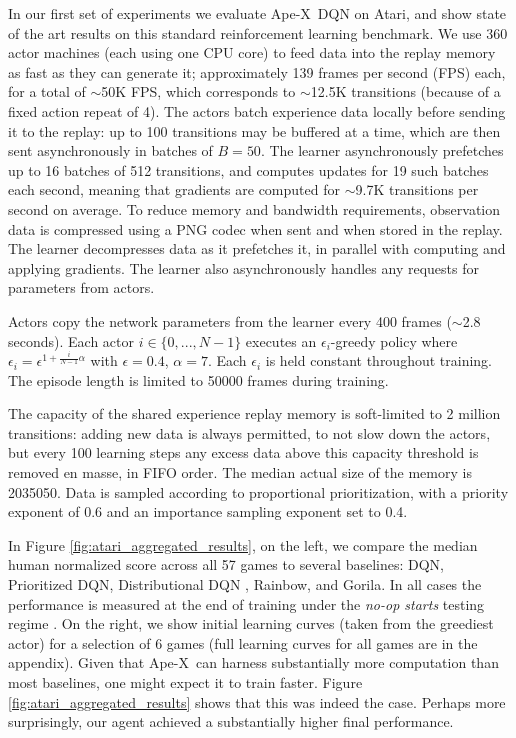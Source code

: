\documentclass{article} \PassOptionsToPackage{usenames,dvipsnames}{xcolor}
\def\apex{Ape-X}
\begin{document}
\setlength\dashlinedash{1pt}
\setlength\dashlinegap{1.5pt}
\setlength\arrayrulewidth{0.3pt}

In our first set of experiments we evaluate \apex\ DQN on Atari, and show state of the art results on this standard reinforcement learning benchmark. We use 360 actor machines (each using one CPU core) to feed data into the replay memory as fast as they can generate it; approximately 139 frames per second (FPS) each, for a total of $\sim$50K FPS, which corresponds to $\sim$12.5K transitions (because of a fixed action repeat of 4). The actors batch experience data locally before sending it to the replay: up to 100 transitions may be buffered at a time, which are then sent asynchronously in batches of $B = 50$. The learner asynchronously prefetches up to 16 batches of 512 transitions, and computes updates for 19 such batches each second, meaning that gradients are computed for $\sim$9.7K transitions per second on average. To reduce memory and bandwidth requirements, observation data is compressed using a PNG codec when sent and when stored in the replay. The learner decompresses data as it prefetches it, in parallel with computing and applying gradients. The learner also asynchronously handles any requests for parameters from actors.

Actors copy the network parameters from the learner every 400 frames ($\sim$2.8 seconds). Each actor $i \in \{0, ..., N-1\}$ executes an $\epsilon_i$-greedy policy where $\epsilon_i = \epsilon^{1 + \frac{i}{N - 1} \alpha} $ with $\epsilon = 0.4$, $\alpha = 7$. Each $\epsilon_i$ is held constant throughout training. The episode length is limited to 50000 frames during training.

The capacity of the shared experience replay memory is soft-limited to 2 million transitions: adding new data is always permitted, to not slow down the actors, but every 100 learning steps any excess data above this capacity threshold is removed en masse, in FIFO order. The median actual size of the memory is 2035050. Data is sampled according to proportional prioritization, with a priority exponent of 0.6 and an importance sampling exponent set to 0.4.

In Figure \ref{fig:atari_aggregated_results}, on the left, we compare the median human normalized score across all 57 games to several baselines: DQN, Prioritized DQN, Distributional DQN \citep{distributional}, Rainbow, and Gorila. In all cases the performance is measured at the end of training under the \emph{no-op starts} testing regime \citep{dqn}. On the right, we show initial learning curves (taken from the greediest actor) for a selection of 6 games (full learning curves for all games are in the appendix). Given that \apex\ can harness substantially more computation than most baselines, one might expect it to train faster. Figure \ref{fig:atari_aggregated_results} shows that this was indeed the case. Perhaps more surprisingly, our agent achieved a substantially higher final performance.
\end{document}
